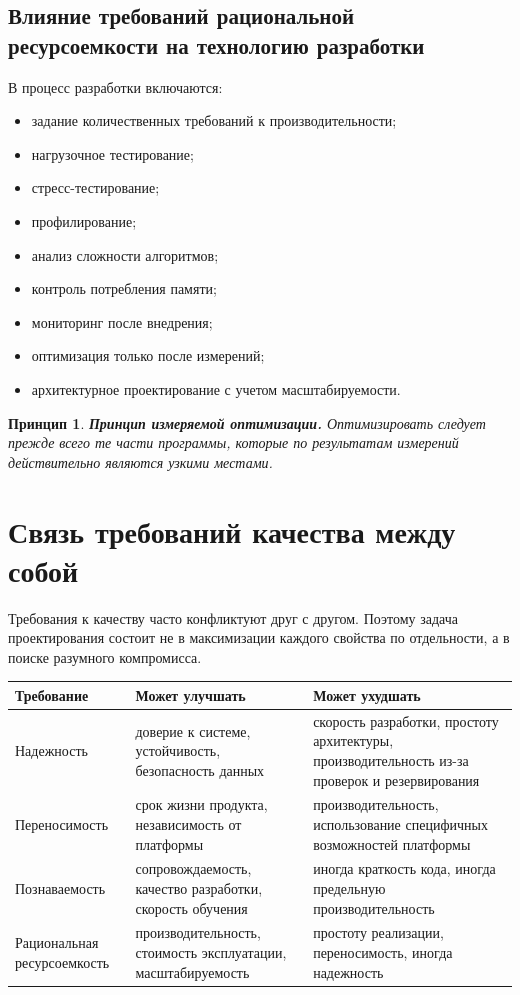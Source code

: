 \documentclass[12pt,a4paper]{article}
\newtheorem{principle}{Принцип}
\begin{document}
\subsection{Влияние требований рациональной ресурсоемкости на технологию разработки}

В процесс разработки включаются:
\begin{itemize}
    \item задание количественных требований к производительности;
    \item нагрузочное тестирование;
    \item стресс-тестирование;
    \item профилирование;
    \item анализ сложности алгоритмов;
    \item контроль потребления памяти;
    \item мониторинг после внедрения;
    \item оптимизация только после измерений;
    \item архитектурное проектирование с учетом масштабируемости.
\end{itemize}

\begin{principle}
\textbf{Принцип измеряемой оптимизации.}
Оптимизировать следует прежде всего те части программы, которые по результатам измерений действительно являются узкими местами.
\end{principle}

\section{Связь требований качества между собой}

Требования к качеству часто конфликтуют друг с другом. Поэтому задача проектирования состоит не в максимизации каждого свойства по отдельности, а в поиске разумного компромисса.

\begin{longtable}{p{} p{} p{}}
\toprule
\textbf{Требование} & \textbf{Может улучшать} & \textbf{Может ухудшать} \\
\midrule
Надежность & доверие к системе, устойчивость, безопасность данных & скорость разработки, простоту архитектуры, производительность из-за проверок и резервирования \\
\midrule
Переносимость & срок жизни продукта, независимость от платформы & производительность, использование специфичных возможностей платформы \\
\midrule
Познаваемость & сопровождаемость, качество разработки, скорость обучения & иногда краткость кода, иногда предельную производительность \\
\midrule
Рациональная ресурсоемкость & производительность, стоимость эксплуатации, масштабируемость & простоту реализации, переносимость, иногда надежность \\
\bottomrule
\end{longtable}
\end{document}

